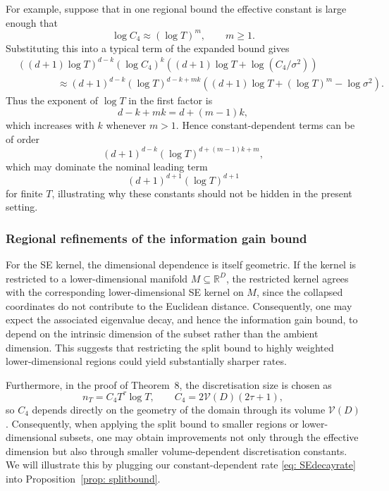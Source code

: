 \begin{remark}
For example, suppose that in one regional bound the effective constant is large enough that
\begin{equation*}
\log C_4 \approx (\log T)^m,
\qquad
m\geq 1.
\end{equation*}
Substituting this into a typical term of the expanded bound gives
\begin{align*}
&\left(
(d+1)\log T
\right)^{d-k}
(\log C_4)^k
\left(
(d+1)\log T+\log(C_4/\sigma^2)
\right) \\
& \qquad \qquad \approx
(d+1)^{d-k}
(\log T)^{d-k+mk}
\left(
(d+1)\log T+(\log T)^m-\log\sigma^2
\right).
\end{align*}
Thus the exponent of $\log T$ in the first factor is
\begin{equation*}
d-k+mk
=
d+(m-1)k,
\end{equation*}
which increases with $k$ whenever $m>1$. Hence constant-dependent terms can be of order
\begin{equation*}
(d+1)^{d-k}
(\log T)^{d+(m-1)k+m},
\end{equation*}
which may dominate the nominal leading term
\begin{equation*}
(d+1)^{d+1}(\log T)^{d+1}
\end{equation*}
for finite $T$, illustrating why these constants should not be hidden in the present setting. \end{remark}

\subsubsection{Regional refinements of the information gain bound}

For the SE kernel, the dimensional dependence is itself geometric. If the kernel is restricted to a lower-dimensional manifold $M\subseteq\mathbb R^D$, the restricted kernel agrees with the corresponding lower-dimensional SE kernel on $M$, since the collapsed coordinates do not contribute to the Euclidean distance. Consequently, one may expect the associated eigenvalue decay, and hence the information gain bound, to depend on the intrinsic dimension of the subset rather than the ambient dimension. This suggests that restricting the split bound to highly weighted lower-dimensional regions could yield substantially sharper rates.

Furthermore, in the proof of Theorem~8, the discretisation size is chosen as
\begin{equation*}
n_T
=
C_4T^\tau\log T,
\qquad
C_4
=
2\mathcal{V}(D)(2\tau+1),
\end{equation*}
so $C_4$ depends directly on the geometry of the domain through its volume $\mathcal{V}(D)$. Consequently, when applying the split bound to smaller regions or lower-dimensional subsets, one may obtain improvements not only through the effective dimension but also through smaller volume-dependent discretisation constants.  We will illustrate this by plugging our constant-dependent rate \eqref{eq: SEdecayrate} into Proposition~\ref{prop: splitbound}.


